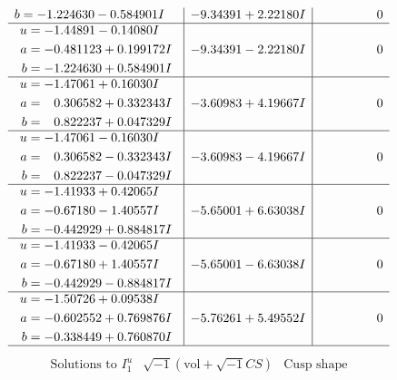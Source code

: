\documentclass[1p]{elsarticle_modified}
\theoremstyle{definition}
\newcommand{\I}{\sqrt{-1}}
\begin{document}
$$\begin{array}{c|c|c}
\begin{aligned}
b &= -1.224630 - 0.584901 I\end{aligned}
 & -9.34391 + 2.22180 I & \phantom{-0.000000 } 0 \\ \hline\begin{aligned}
u &= -1.44891 - 0.14080 I \\
a &= -0.481123 + 0.199172 I \\
b &= -1.224630 + 0.584901 I\end{aligned}
 & -9.34391 - 2.22180 I & \phantom{-0.000000 } 0 \\ \hline\begin{aligned}
u &= -1.47061 + 0.16030 I \\
a &= \phantom{-}0.306582 + 0.332343 I \\
b &= \phantom{-}0.822237 + 0.047329 I\end{aligned}
 & -3.60983 + 4.19667 I & \phantom{-0.000000 } 0 \\ \hline\begin{aligned}
u &= -1.47061 - 0.16030 I \\
a &= \phantom{-}0.306582 - 0.332343 I \\
b &= \phantom{-}0.822237 - 0.047329 I\end{aligned}
 & -3.60983 - 4.19667 I & \phantom{-0.000000 } 0 \\ \hline\begin{aligned}
u &= -1.41933 + 0.42065 I \\
a &= -0.67180 - 1.40557 I \\
b &= -0.442929 + 0.884817 I\end{aligned}
 & -5.65001 + 6.63038 I & \phantom{-0.000000 } 0 \\ \hline\begin{aligned}
u &= -1.41933 - 0.42065 I \\
a &= -0.67180 + 1.40557 I \\
b &= -0.442929 - 0.884817 I\end{aligned}
 & -5.65001 - 6.63038 I & \phantom{-0.000000 } 0 \\ \hline\begin{aligned}
u &= -1.50726 + 0.09538 I \\
a &= -0.602552 + 0.769876 I \\
b &= -0.338449 + 0.760870 I\end{aligned}
 & -5.76261 + 5.49552 I & \phantom{-0.000000 } 0\\
 \hline 
 \end{array}$$\newpage$$\begin{array}{c|c|c}  
\text{Solutions to }I^u_{1}& \I (\text{vol} + \sqrt{-1}CS) & \text{Cusp shape}\\

\end{array}$$
\end{document}
